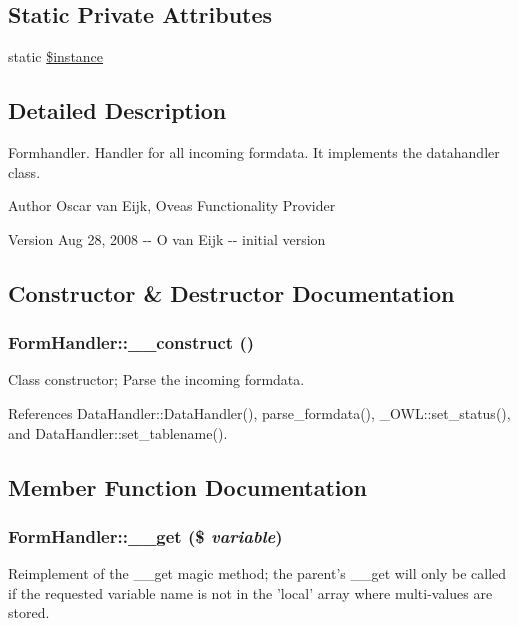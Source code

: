 \subsection*{Static Private Attributes}
\begin{DoxyCompactItemize}
\item 
static \hyperlink{classFormHandler_a54efe3849e4065053f0eb0313356d072}{\$instance}
\end{DoxyCompactItemize}


\subsection{Detailed Description}
Formhandler. Handler for all incoming formdata. It implements the datahandler class. \begin{DoxyAuthor}{Author}
Oscar van Eijk, Oveas Functionality Provider 
\end{DoxyAuthor}
\begin{DoxyVersion}{Version}
Aug 28, 2008 -\/-\/ O van Eijk -\/-\/ initial version 
\end{DoxyVersion}


\subsection{Constructor \& Destructor Documentation}
\subsubsection[{\_\-\_\-construct}]{\setlength{\rightskip}{0pt plus 5cm}FormHandler::\_\-\_\-construct ()}\label{classFormHandler_a1ef7ad4fe143dd8339c8ab66423a1934}
Class constructor; Parse the incoming formdata. 

References DataHandler::DataHandler(), parse\_\-formdata(), \_\-OWL::set\_\-status(), and DataHandler::set\_\-tablename().



\subsection{Member Function Documentation}
\subsubsection[{\_\-\_\-get}]{\setlength{\rightskip}{0pt plus 5cm}FormHandler::\_\-\_\-get (\$ {\em variable})}\label{classFormHandler_a371b8ded5110c6d66bc3a0c3e08fe085}
Reimplement of the \_\-\_\-get magic method; the parent's \_\-\_\-get will only be called if the requested variable name is not in the 'local' array where multi-\/values are stored.


